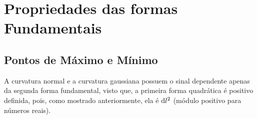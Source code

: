 ﻿%

\chapter{Propriedades das formas Fundamentais}


\section{Pontos de Máximo e Mínimo}


A curvatura normal e a curvatura gaussiana possuem o sinal dependente apenas da segunda forma fundamental, visto que, a primeira forma quadrática é positivo definida, pois, como mostrado anteriormente, ela é $\mathrm{d} l^{2}$ (módulo positivo para números reais). 


